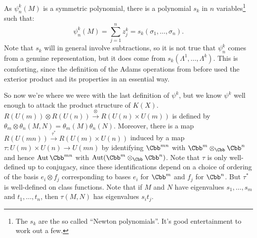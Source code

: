 As $\psi^k_n(M)$ is a symmetric polynomial, there is a polynomial $s_k$ in $n$ variables\footnote{The $s_k$ are the so called ``Newton polynomials''. It's good entertainment to work out a few.} such that:
\[\psi^k_n(M)=\sum_{j=1}^n z_j^k=s_k(\sigma_1,\ldots,\sigma_n).\]
Note that $s_k$ will in general involve subtractions, so it is not true that $\psi^k_n$ comes from a genuine representation, but it does come from $s_k(\Lambda^1, \ldots, \Lambda^k)$.  This is comforting, since the definition of the Adams operations from before used the exterior product and its properties in an essential way.

So now we're where we were with the last definition of $\psi^k$, but we know $\psi^k$ well enough to attack the product structure of $K(X)$.  $R(U(m)) \otimes R(U(n)) \stackrel{\otimes}{\to} R(U(n) \times U(m))$ is defined by $\theta_m \otimes \theta_n(M, N) = \theta_m(M) \theta_n(N)$.  Moreover, there is a map $R(U(mn)) \stackrel{\tau^*}{\to} R(U(m) \times U(n))$ induced by a map $\tau: U(m) \times U(n) \to U(mn)$ by identifying $\Cbb^{mn}$ with $\Cbb^m \otimes_\Cbb \Cbb^n$ and hence $\Aut \Cbb^{mn}$ with $\Aut (\Cbb^m \otimes_\Cbb \Cbb^n)$.  Note that $\tau$ is only well-defined up to conjugacy, since these identifications depend on a choice of ordering of the basis $e_i \otimes f_j$ corresponding to bases $e_i$ for $\Cbb^m$ and $f_j$ for $\Cbb^n$.  But $\tau^*$ is well-defined on class functions.  Note that if $M$ and $N$ have eigenvalues $s_1, \ldots, s_m$ and $t_1, \ldots, t_n$, then $\tau(M, N)$ has eigenvalues $s_i t_j$.

